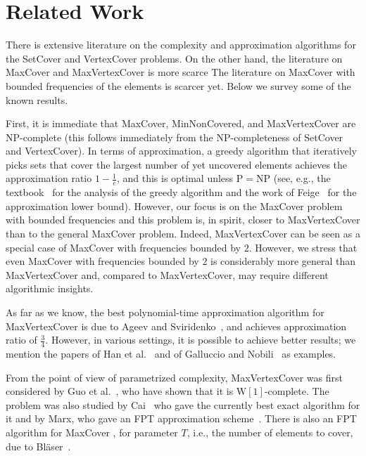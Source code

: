 \documentclass[11pt]{article}
\newcommand{\np}{{\mathrm{NP}}}
\newcommand{\wone}{{\mathrm{W[1]}}}
\newcommand{\p}{{\mathrm{P}}}
\begin{document}
\section{Related Work}\label{sec:related}

There is extensive literature on the complexity and approximation
algorithms for the SetCover and VertexCover problems.
On the other hand, the literature on MaxCover and MaxVertexCover is
more scarce
The literature on MaxCover with bounded frequencies of the elements is
scarcer yet. Below we survey some of the known results.


First, it is immediate that MaxCover, MinNonCovered, and
MaxVertexCover are $\np$-complete (this follows immediately from the
$\np$-completeness of SetCover and VertexCover). In terms of
approximation, a greedy algorithm that iteratively picks sets that
cover the largest number of yet uncovered elements achieves the
approximation ratio $1-\frac{1}{e}$, and this is optimal unless $\p =
\np$ (see, e.g., the textbook~\cite{hoc:b:covers} for the analysis of
the greedy algorithm and the work of Feige~\cite{fei:j:cover} for the
approximation lower bound). However, our focus is on the MaxCover
problem with bounded frequencies and this problem is, in spirit,
closer to MaxVertexCover than to the general MaxCover problem. Indeed,
MaxVertexCover can be seen as a special case of MaxCover with
frequencies bounded by $2$. However, we stress that even MaxCover with
frequencies bounded by $2$ is considerably more general than
MaxVertexCover and, compared to MaxVertexCover, may require different
algorithmic insights.

As far as we know, the best polynomial-time approximation algorithm
for MaxVertexCover is due to Ageev and
Sviridenko~\cite{age-svi:b:covers}, and achieves approximation ratio
of $\frac{3}{4}$. However, in various settings, it is possible to
achieve better results; we mention the papers of Han et
al.~\cite{han-ye-zha-zha:j:cover} and of Galluccio and
Nobili~\cite{gal-nob:j:cover} as examples.

From the point of view of parametrized complexity, MaxVertexCover was
first considered by Guo et
al.~\cite{guo-nie-wer:j:vertex-cover-variants}, who have shown that it
is $\wone$-complete. The problem was also studied by
Cai~\cite{cai:j:cardinality-constrained} who gave the currently best
exact algorithm for it and by Marx, who gave an FPT approximation
scheme~\cite{Marx06parameterizedcomplexity}. There is also an FPT
algorithm for MaxCover , for parameter $T$, i.e., the number of
elements to cover, due to Bl{\"a}ser~\cite{bla:j:partial-set-cover}.
\end{document}
